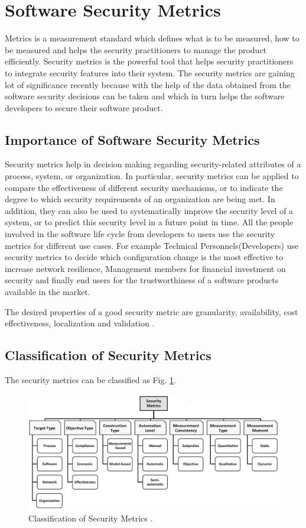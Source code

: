 \documentclass[pdftex,english,oribibl]{llncs}
\begin{document}
\section{Software Security Metrics}\label{sec:softwaremetrics}
Metrics is a measurement standard which defines what is to be measured, how to be measured and helps the security practitioners to manage the product efficiently. Security metrics is the powerful tool that helps security practitioners to integrate security features into their system. The security metrics are gaining lot of significance recently because with the help of the data obtained from the software security decisions can be taken and which in turn helps the software developers to secure their software product. 

\subsection{Importance of Software Security Metrics}
Security metrics help in decision making regarding security-related attributes of a process, system, or organization. In particular, security metrics can be applied to compare the effectiveness of different security mechanisms, or to indicate the degree to which security requirements of an organization are being met. In addition, they can also be used to systematically improve the security level of a system, or to predict this security level in a future point in time. All the people involved in the software life cycle from developers to users use the security metrics for different use cases. For example Technical Personnels(Developers) use security metrics to decide which configuration change is the most effective to increase network resilience, Management members for financial investment on security and finally end users for the trustworthiness of a software products available in the market.

The desired properties of a good security metric are granularity, availability, cost effectiveness, localization and validation \cite{8017389_Ramos}. 
\subsection{Classification of Security Metrics}
The security metrics can be classified as Fig. \ref{fig:security_metric_types}.

\begin{figure}[h]
	\centering\includegraphics[width=\linewidth]{figures/security_metric_types.jpg}
	\caption{Classification of Security Metrics \cite{8017389_Ramos}.}
	\label{fig:security_metric_types}
\end{figure}
\end{document}
